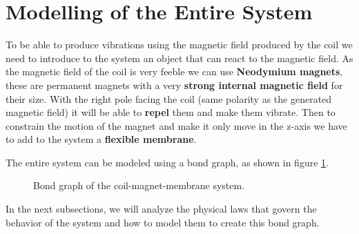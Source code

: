 \section{Modelling of the Entire System}
To be able to produce vibrations using the magnetic field produced by the coil we need to introduce to the system an object that can react to the magnetic field. As the magnetic field of the coil is very feeble we can use \textbf{Neodymium magnets}, these are permanent magnets with a very \textbf{strong internal magnetic field} for their size.
With the right pole facing the coil (same polarity as the generated magnetic field) it will be able to \textbf{repel} them and make them vibrate.
Then to constrain the motion of the magnet and make it only move in the z-axis we have to add to the system a \textbf{flexible membrane}.

\begin{samepage}
    The entire system can be modeled using a bond graph, as shown in figure \ref{fig: Total_bond-graph}.
    \nopagebreak

    \begin{figure}[H]
        \centering
        \resizebox{1\linewidth}{!}{
            
        } %
        \caption{Bond graph of the coil-magnet-membrane system.}
        \label{fig: Total_bond-graph}
    \end{figure}
\end{samepage}

In the next subsections, we will analyze the physical laws that govern the behavior of the system and how to model them to create this bond graph.








